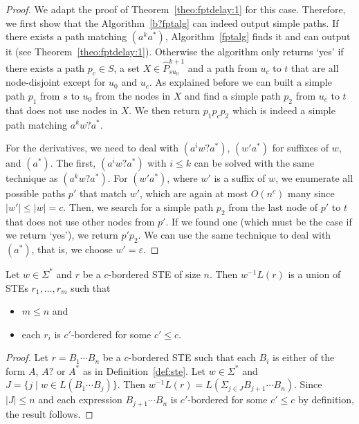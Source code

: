 \documentclass[a4paper,english]{lipics-v2016}
\theoremstyle{plain}
\begin{document}
\fptdelayii*
\begin{proof}
We adapt the proof of Theorem~\ref{theo:fptdelay:1} for this case.
Therefore, we first show that the Algorithm~\ref{b?fptalg} can indeed output simple paths.
If there exists a path matching \nodesimpath$(a^ka^*)$, Algorithm~\ref{fptalg} finds it and can output it (see Theorem~\ref{theo:fptdelay:1}). Otherwise the algorithm only returns `yes' if there exists a path $p_c \in S$, a set $X \in \hat{P}^{k+1}_{su_0}$ and a path from $u_c$ to $t$ that are all node-disjoint except for $u_0$ and $u_c$. As explained before we can built a simple path $p_1$ from $s$ to $u_0$ from the nodes in $X$ and find a simple path $p_2$ from $u_c$ to $t$ that does not use nodes in $X$.
We then return $p_1 p_c p_2$ which is indeed a simple path matching $a^k w? a^*$.

For the derivatives, we need to deal with \nodesimpath$(a^iw?a^*)$, \nodesimpath$(w'a^*)$ for suffixes of $w$, and \nodesimpath$(a^*)$.
The first, \nodesimpath$(a^iw?a^*)$ with $i \leq k$ can be solved with the
same technique as \nodesimpath$(a^kw?a^*)$. For \nodesimpath$(w'a^*)$, where
$w'$ is a suffix of $w$, we enumerate all possible paths $p'$ that
match $w'$, which are again at most $O(n^c)$ many since $|w'| \leq |w|
=c$. Then, we search for a simple path $p_2$ from the last node of $p'$ to $t$
that does not use other nodes from $p'$. If we found one (which must be the case if we return `yes'), we return $p'p_2$.
We can use the same technique to deal with \nodesimpath$(a^*)$, that is, we choose $w' = \varepsilon$.
\end{proof}

\begin{lemma}\label{lem:ste-derivatives}
  Let $w \in \Sigma^*$ and $r$ be a $c$-bordered STE of size $n$. Then $w^{-1}L(r)$ is a union
  of STEs $r_1, \ldots, r_m$ such that 
  \begin{itemize}
  \item $m \leq n$ and
  \item each $r_i$ is $c'$-bordered for some $c' \leq c$.
  \end{itemize}
\end{lemma}
\begin{proof}
  Let $r = B_1 \cdots B_n$ be a $c$-bordered STE such that each $B_i$ is either of
  the form $A$, $A?$ or $A^*$ as in Definition~\ref{def:ste}.
  Let $w\in \Sigma^*$ and $J = \{j \mid w \in L(B_1 \cdots
  B_j)\}$. Then $w^{-1}L(r) = L(\Sigma_{j \in J} B_{j+1} \cdots
  B_n)$. Since $|J| \leq n$ and each expression $B_{j+1} \cdots
  B_n$ is $c'$-bordered for some $c' \leq c$ by definition, the result follows.
\end{proof}
\end{document}
